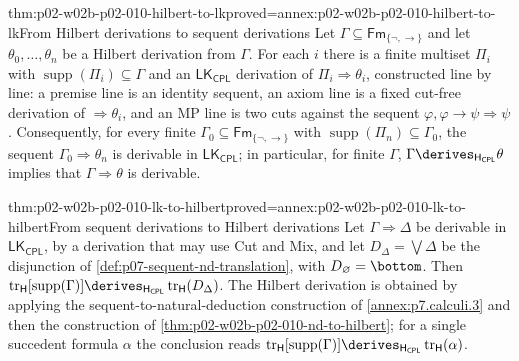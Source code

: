 \begin{hbtheorem}{thm:p02-w02b-p02-010-hilbert-to-lk}{proved=annex:p02-w02b-p02-010-hilbert-to-lk}{From Hilbert derivations to sequent derivations}
Let \(\Gamma\subseteq\mathsf{Fm}_{\{\neg,\to\}}\) and let
\(\theta_0,\ldots,\theta_n\) be a Hilbert derivation from \(\Gamma\).  For
each \(i\) there is a finite multiset \(\Pi_i\) with
\(\operatorname{supp}(\Pi_i)\subseteq\Gamma\) and an
\(\mathsf{LK}_{\mathsf{CPL}}\) derivation of \(\Pi_i\Rightarrow\theta_i\),
constructed line by line: a premise line is an identity sequent, an axiom
line is a fixed cut-free derivation of \(\Rightarrow\theta_i\), and an MP line
is two cuts against the sequent \(\varphi,\varphi\to\psi\Rightarrow\psi\).
Consequently, for every finite \(\Gamma_0\subseteq\mathsf{Fm}_{\{\neg,\to\}}\)
with \(\operatorname{supp}(\Pi_n)\subseteq\Gamma_0\), the sequent
\(\Gamma_0\Rightarrow\theta_n\) is derivable in \(\mathsf{LK}_{\mathsf{CPL}}\);
in particular, for finite \(\Gamma\),
\(\Gamma\derives_{\mathsf H_{\mathsf{CPL}}}\theta\) implies that
\(\Gamma\Rightarrow\theta\) is derivable.
\end{hbtheorem}

\begin{hbtheorem}{thm:p02-w02b-p02-010-lk-to-hilbert}{proved=annex:p02-w02b-p02-010-lk-to-hilbert}{From sequent derivations to Hilbert derivations}
Let \(\Gamma\Rightarrow\Delta\) be derivable in \(\mathsf{LK}_{\mathsf{CPL}}\),
by a derivation that may use Cut and Mix, and let \(D_{\Delta}=\bigvee\Delta\) be the disjunction of
\cref{def:p07-sequent-nd-translation}, with \(D_{\varnothing}=\bottom\).
Then
\(\operatorname{tr}_{\mathsf H}[\operatorname{supp}(\Gamma)]
\derives_{\mathsf H_{\mathsf{CPL}}}\operatorname{tr}_{\mathsf H}(D_{\Delta})\).
The Hilbert derivation is obtained by applying the sequent-to-natural-deduction
construction of \cref{annex:p7.calculi.3} and then the construction of
\cref{thm:p02-w02b-p02-010-nd-to-hilbert}; for a single succedent formula
\(\alpha\) the conclusion reads
\(\operatorname{tr}_{\mathsf H}[\operatorname{supp}(\Gamma)]
\derives_{\mathsf H_{\mathsf{CPL}}}\operatorname{tr}_{\mathsf H}(\alpha)\).
\end{hbtheorem}

